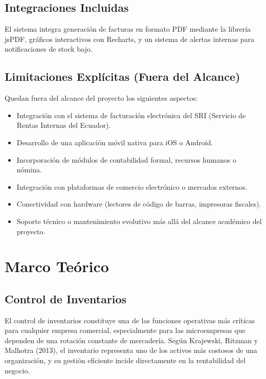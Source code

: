\documentclass[12pt, letterpaper]{report}
\begin{document}
\section{Integraciones Incluidas}

El sistema integra generación de facturas en formato PDF mediante la librería jsPDF, gráficos interactivos con Recharts, y un sistema de alertas internas para notificaciones de stock bajo.

\section{Limitaciones Explícitas (Fuera del Alcance)}

Quedan fuera del alcance del proyecto los siguientes aspectos:
\begin{itemize}
    \item Integración con el sistema de facturación electrónica del SRI (Servicio de Rentas Internas del Ecuador).
    \item Desarrollo de una aplicación móvil nativa para iOS o Android.
    \item Incorporación de módulos de contabilidad formal, recursos humanos o nómina.
    \item Integración con plataformas de comercio electrónico o mercados externos.
    \item Conectividad con hardware (lectores de código de barras, impresoras fiscales).
    \item Soporte técnico o mantenimiento evolutivo más allá del alcance académico del proyecto.
\end{itemize}


\chapter{Marco Teórico}

\section{Control de Inventarios}

El control de inventarios constituye una de las funciones operativas más críticas para cualquier empresa comercial, especialmente para las microempresas que dependen de una rotación constante de mercadería. Según Krajewski, Ritzman y Malhotra (2013), el inventario representa uno de los activos más costosos de una organización, y su gestión eficiente incide directamente en la rentabilidad del negocio.
\end{document}
